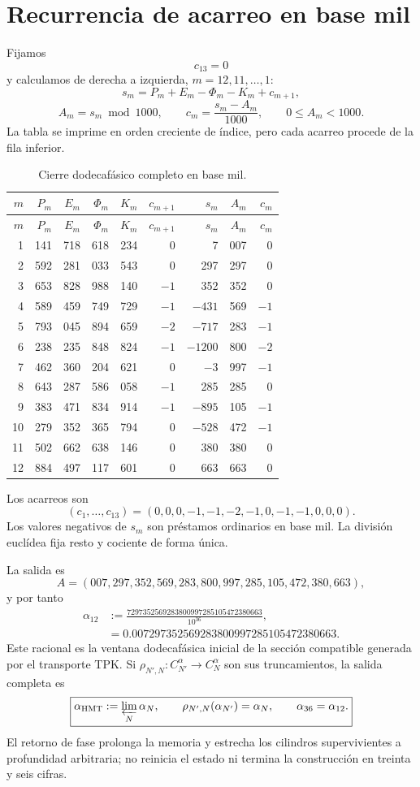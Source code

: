 \section{Recurrencia de acarreo en base mil}

Fijamos
\[
c_{13}=0
\]
y calculamos de derecha a izquierda, \(m=12,11,\ldots,1\):
\[
s_m=P_m+E_m-\Phi_m-K_m+c_{m+1},
\]
\[
A_m=s_m\bmod1000,
\qquad
c_m=\frac{s_m-A_m}{1000},
\qquad0\le A_m<1000.
\]
La tabla se imprime en orden creciente de índice, pero cada acarreo procede de la fila
inferior.

\begingroup
\scriptsize
\setlength{\tabcolsep}{3.3pt}
\begin{longtable}{@{}r|rrrr|rr|rr@{}}
\caption{Cierre dodecafásico completo en base mil.}\label{tab:acarreo-alpha}\\
\toprule
\(m\)&\(P_m\)&\(E_m\)&\(\Phi_m\)&\(K_m\)&\(c_{m+1}\)&\(s_m\)&\(A_m\)&\(c_m\)\\
\midrule
\endfirsthead
\toprule
\(m\)&\(P_m\)&\(E_m\)&\(\Phi_m\)&\(K_m\)&\(c_{m+1}\)&\(s_m\)&\(A_m\)&\(c_m\)\\
\midrule
\endhead
1&141&718&618&234&0&7&007&0\\
2&592&281&033&543&0&297&297&0\\
3&653&828&988&140&\(-1\)&352&352&0\\
4&589&459&749&729&\(-1\)&\(-431\)&569&\(-1\)\\
5&793&045&894&659&\(-2\)&\(-717\)&283&\(-1\)\\
6&238&235&848&824&\(-1\)&\(-1200\)&800&\(-2\)\\
7&462&360&204&621&0&\(-3\)&997&\(-1\)\\
8&643&287&586&058&\(-1\)&285&285&0\\
9&383&471&834&914&\(-1\)&\(-895\)&105&\(-1\)\\
10&279&352&365&794&0&\(-528\)&472&\(-1\)\\
11&502&662&638&146&0&380&380&0\\
12&884&497&117&601&0&663&663&0\\
\bottomrule
\end{longtable}
\endgroup

Los acarreos son
\[
(c_1,\ldots,c_{13})
=(0,0,0,-1,-1,-2,-1,0,-1,-1,0,0,0).
\]
Los valores negativos de \(s_m\) son préstamos ordinarios en base mil. La
división euclídea fija resto y cociente de forma única.

La salida es
\[
\boxed{
A=(007,297,352,569,283,800,997,285,105,472,380,663),}
\]
y por tanto
\[
\boxed{
\begin{aligned}
\alpha_{12}
&:=\frac{7297352569283800997285105472380663}{10^{36}},\\
&=0.007297352569283800997285105472380663.
\end{aligned}}
\]
Este racional es la ventana dodecafásica inicial de la sección compatible
generada por el transporte TPK. Si
\(\rho_{N',N}:C_{N'}^\alpha\to C_N^\alpha\) son sus truncamientos, la
salida completa es
\[
 \boxed{
 \alpha_{\mathrm{HMT}}
 :=\varprojlim_N\alpha_N,\qquad
 \rho_{N',N}(\alpha_{N'})=\alpha_N,\qquad
 \alpha_{36}=\alpha_{12}.}
\]
El retorno de fase prolonga la memoria y estrecha los cilindros
supervivientes a profundidad arbitraria; no reinicia el estado ni termina la
construcción en treinta y seis cifras.

